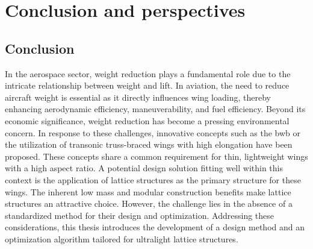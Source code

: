 \chapter*{Conclusion and perspectives}
{}
%

\section*{Conclusion}
In the aerospace sector, weight reduction plays a fundamental role due to the intricate relationship between weight and lift. In aviation, the need to reduce aircraft weight is essential as it directly influences wing loading, thereby enhancing aerodynamic efficiency, maneuverability, and fuel efficiency. Beyond its economic significance, weight reduction has become a pressing environmental concern. In response to these challenges, innovative concepts such as the \gls{bwb} or the utilization of transonic truss-braced wings with high elongation have been proposed. These concepts share a common requirement for thin, lightweight wings with a high aspect ratio. A potential design solution fitting well within this context is the application of lattice structures as the primary structure for these wings. The inherent low mass and modular construction benefits make lattice structures an attractive choice. However, the challenge lies in the absence of a standardized method for their design and optimization. Addressing these considerations, this thesis introduces the development of a design method and an optimization algorithm tailored for ultralight lattice structures.

